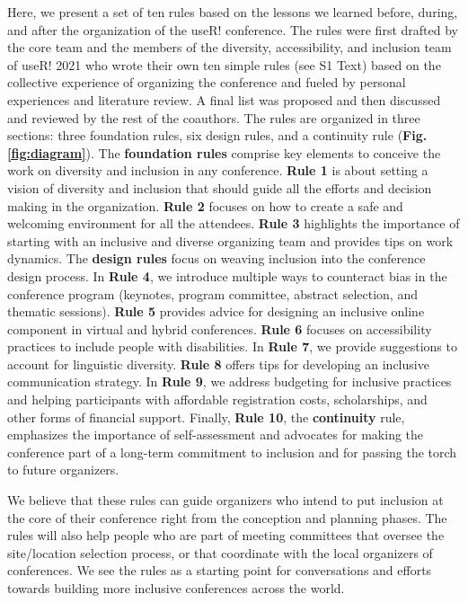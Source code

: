 \documentclass[10pt,letterpaper]{article}
\begin{document}
Here, we present a set of ten rules based on the lessons we learned before, during, and after the organization of the useR! conference.
 The rules were first drafted by the core team and the members of the diversity, accessibility, and inclusion team of useR! 2021 who wrote their own ten simple rules (see S1 Text) based on the collective experience of organizing the conference and fueled by personal experiences and literature review.
A final list was proposed and then discussed and reviewed by the rest of the coauthors. 
The rules are organized in three sections: three foundation rules, six design rules, and a continuity rule (\textbf{Fig. \ref{fig:diagram}}).
The \textbf{foundation rules} comprise key elements to conceive the work on diversity and inclusion in any conference. 
\textbf{Rule 1} is about setting a vision of diversity and inclusion that should guide all the efforts and decision making in the organization.
\textbf{Rule 2} focuses on how to create a safe and welcoming environment for all the attendees. 
\textbf{Rule 3} highlights the importance of starting with an inclusive and diverse organizing team and provides tips on work dynamics.
The \textbf{design rules} focus on weaving inclusion into the conference design process.
In \textbf{Rule 4}, we introduce multiple ways to counteract bias in the conference program (keynotes, program committee, abstract selection, and thematic sessions). 
\textbf{Rule 5} provides advice for designing an inclusive online component in virtual and hybrid conferences.
\textbf{Rule 6} focuses on accessibility practices to include people with disabilities.
In \textbf{Rule 7}, we provide suggestions to account for linguistic diversity. 
\textbf{Rule 8} offers tips for developing an inclusive communication strategy. 
In \textbf{Rule 9}, we address budgeting for inclusive practices and helping participants with affordable registration costs, scholarships, and other forms of financial support.
Finally, 
\textbf{Rule 10}, the \textbf{continuity} rule, emphasizes the importance of self-assessment and advocates for making the conference part of a long-term commitment to inclusion and for passing the torch to future organizers. 

We believe that these rules can guide organizers who intend to put inclusion at the core of their conference right from the conception and planning phases.
The rules will also help people who are part of meeting committees that oversee the site/location selection process, or that coordinate with the local organizers of conferences. 
We see the rules as a starting point for conversations and efforts towards building more inclusive conferences across the world.
\end{document}
